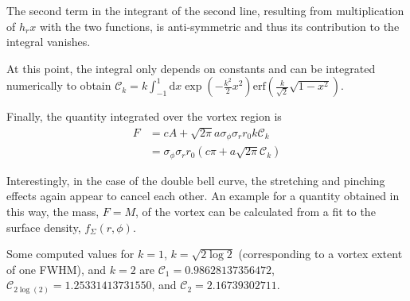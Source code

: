 \documentclass[a4paper]{scrartcl}
\begin{document}
The second term in the integrant of the second line, resulting from multiplication of $h_r x$ with the two functions,
is anti-symmetric and thus its contribution to the integral vanishes.

At this point, the integral only depends on constants and can be integrated numerically to obtain $\mathcal{C}_k = k \int_{-1}^{1} \mathrm{d}x \exp\left( - \frac{k^2}{2} x^2\right)
  \mathrm{erf} \left( \frac{k}{\sqrt{2}} \sqrt{1 - x^2} \right)$.

Finally, the quantity integrated over the vortex region is
\begin{align}
  F & = c A + \sqrt{2\pi} a \sigma_\phi \sigma_r r_0 k \mathcal{C}_k                \\
    & = \sigma_\phi \sigma_r r_0 \left( c \pi + a \sqrt{2\pi} \mathcal{C}_k \right)
\end{align}

Interestingly, in the case of the double bell curve, the stretching and pinching effects again appear to cancel each other.
An example for a quantity obtained in this way, the mass, $F=M$, of the vortex can be calculated from a fit to the
surface density, $f_\Sigma(r, \phi)$.

Some computed values for $k=1$, $k=\sqrt{2\log{2}}$ (corresponding to a vortex extent of one FWHM), and $k=2$ 
are $\mathcal{C}_1 = 0.98628137356472$,
$\mathcal{C}_{2\log(2)} = 1.25331413731550$, and $\mathcal{C}_2 = 2.16739302711$.
\end{document}
